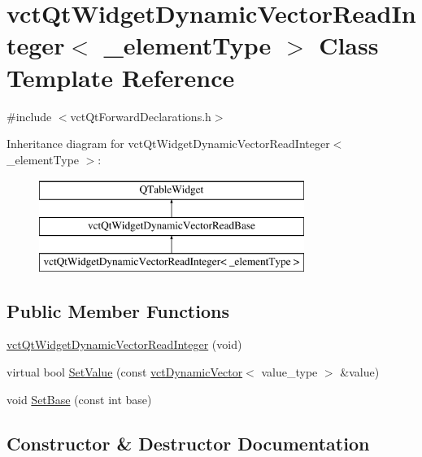 \hypertarget{classvct_qt_widget_dynamic_vector_read_integer}{}\section{vct\+Qt\+Widget\+Dynamic\+Vector\+Read\+Integer$<$ \+\_\+element\+Type $>$ Class Template Reference}
\label{classvct_qt_widget_dynamic_vector_read_integer}


{\ttfamily \#include $<$vct\+Qt\+Forward\+Declarations.\+h$>$}

Inheritance diagram for vct\+Qt\+Widget\+Dynamic\+Vector\+Read\+Integer$<$ \+\_\+element\+Type $>$\+:\begin{figure}[H]
\begin{center}
\leavevmode
\includegraphics[height=3.000000cm]{db/df1/classvct_qt_widget_dynamic_vector_read_integer}
\end{center}
\end{figure}
\subsection*{Public Member Functions}
\begin{DoxyCompactItemize}
\item 
\hyperlink{classvct_qt_widget_dynamic_vector_read_integer_a2964417ce6c2001c22527ec246d41648}{vct\+Qt\+Widget\+Dynamic\+Vector\+Read\+Integer} (void)
\item 
virtual bool \hyperlink{classvct_qt_widget_dynamic_vector_read_integer_ad4f251712e6c6771401e8e667c23b89b}{Set\+Value} (const \hyperlink{classvct_dynamic_vector}{vct\+Dynamic\+Vector}$<$ value\+\_\+type $>$ \&value)
\item 
void \hyperlink{classvct_qt_widget_dynamic_vector_read_integer_a2dc32b2047bd4c96f0e5d6e1b0262f23}{Set\+Base} (const int base)
\end{DoxyCompactItemize}


\subsection{Constructor \& Destructor Documentation}
\hypertarget{classvct_qt_widget_dynamic_vector_read_integer_a2964417ce6c2001c22527ec246d41648}{}
